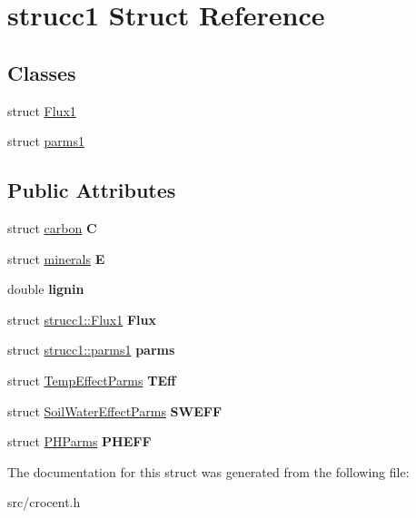 \hypertarget{structstrucc1}{\section{strucc1 Struct Reference}
\label{structstrucc1}
}
\subsection*{Classes}
\begin{DoxyCompactItemize}
\item 
struct \hyperlink{structstrucc1_1_1_flux1}{Flux1}
\item 
struct \hyperlink{structstrucc1_1_1parms1}{parms1}
\end{DoxyCompactItemize}
\subsection*{Public Attributes}
\begin{DoxyCompactItemize}
\item 
\hypertarget{structstrucc1_a519eb0262f258056017d032e5b2655cd}{struct \hyperlink{structcarbon}{carbon} {\bfseries C}}\label{structstrucc1_a519eb0262f258056017d032e5b2655cd}

\item 
\hypertarget{structstrucc1_a342539b9794954552309bb86c1a8b091}{struct \hyperlink{structminerals}{minerals} {\bfseries E}}\label{structstrucc1_a342539b9794954552309bb86c1a8b091}

\item 
\hypertarget{structstrucc1_adc9fd415ee1606d9643e7f57d542071b}{double {\bfseries lignin}}\label{structstrucc1_adc9fd415ee1606d9643e7f57d542071b}

\item 
\hypertarget{structstrucc1_aa0a5b652884cb04ada88a6365fa054c2}{struct \hyperlink{structstrucc1_1_1_flux1}{strucc1\-::\-Flux1} {\bfseries Flux}}\label{structstrucc1_aa0a5b652884cb04ada88a6365fa054c2}

\item 
\hypertarget{structstrucc1_a00282c3311075345da9b794c3106aaa3}{struct \hyperlink{structstrucc1_1_1parms1}{strucc1\-::parms1} {\bfseries parms}}\label{structstrucc1_a00282c3311075345da9b794c3106aaa3}

\item 
\hypertarget{structstrucc1_a3baddf06324d0ad408026d054b317ff4}{struct \hyperlink{struct_temp_effect_parms}{Temp\-Effect\-Parms} {\bfseries T\-Eff}}\label{structstrucc1_a3baddf06324d0ad408026d054b317ff4}

\item 
\hypertarget{structstrucc1_aae215825285294acfdd993d990d8a83f}{struct \hyperlink{struct_soil_water_effect_parms}{Soil\-Water\-Effect\-Parms} {\bfseries S\-W\-E\-F\-F}}\label{structstrucc1_aae215825285294acfdd993d990d8a83f}

\item 
\hypertarget{structstrucc1_af59348a7eaab9b835ccaa58dd1661d29}{struct \hyperlink{struct_p_h_parms}{P\-H\-Parms} {\bfseries P\-H\-E\-F\-F}}\label{structstrucc1_af59348a7eaab9b835ccaa58dd1661d29}

\end{DoxyCompactItemize}


The documentation for this struct was generated from the following file\-:\begin{DoxyCompactItemize}
\item 
src/crocent.\-h\end{DoxyCompactItemize}
